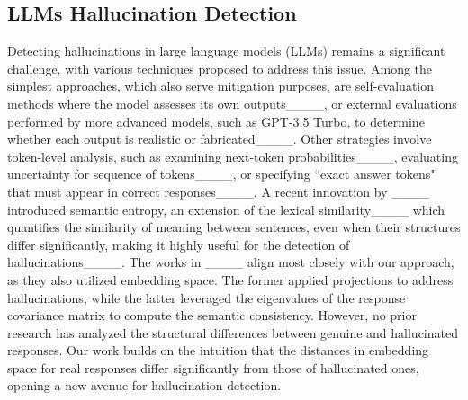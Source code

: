 \subsection{LLMs Hallucination Detection} \label{sub:detection}
Detecting hallucinations in large language models (LLMs) remains a significant challenge, with various techniques proposed to address this issue. Among the simplest approaches, which also serve mitigation purposes, are self-evaluation methods where the model assesses its own outputs____, or external evaluations performed by more advanced models, such as GPT-3.5 Turbo, to determine whether each output is realistic or fabricated____. 
Other strategies involve token-level analysis, such as examining next-token probabilities____, evaluating uncertainty for sequence of tokens____, or specifying 
``exact answer tokens" that must appear in correct responses____. A recent innovation by ____ introduced semantic entropy, an extension of the lexical similarity____ which quantifies the similarity of meaning between sentences, even when their structures differ significantly, making it highly useful for the detection of hallucinations____.
The works in ____ align most closely with our approach, as they also utilized embedding space. The former applied projections to address hallucinations, while the latter leveraged the eigenvalues of the response covariance matrix to compute the semantic consistency. However, no prior research has analyzed the structural differences between genuine and hallucinated responses. Our work builds on the intuition that the distances in embedding space for real responses differ significantly from those of hallucinated ones, opening a new avenue for hallucination detection.